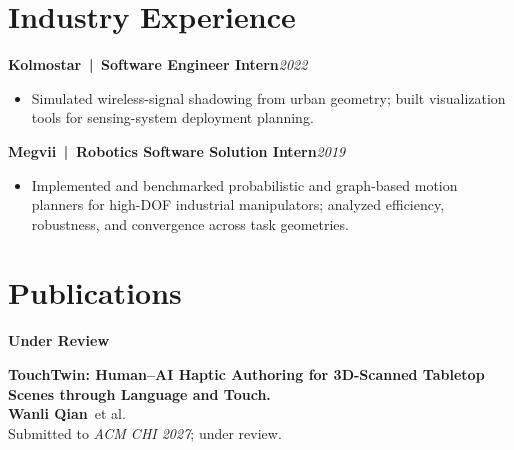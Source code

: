 \documentclass[10pt,letterpaper]{article}
\newcommand{\entry}[2]{\textbf{#1}\hfill\textit{#2}\\}
\newcommand{\pub}[3]{\begin{minipage}[t]{\linewidth}#1\\[-1pt]#2\\[-1pt]#3\end{minipage}\par\vspace{5pt}}
\newcommand{\me}{\textbf{Wanli Qian}}
\begin{document}
\section{Industry Experience}
\entry{Kolmostar \,|\, Software Engineer Intern}{2022}
\vspace{-11pt}
\begin{itemize}
  \item Simulated wireless-signal shadowing from urban geometry; built visualization tools for sensing-system deployment planning.
\end{itemize}
\entry{Megvii \,|\, Robotics Software Solution Intern}{2019}
\vspace{-11pt}
\begin{itemize}
  \item Implemented and benchmarked probabilistic and graph-based motion planners for high-DOF industrial manipulators;
        analyzed efficiency, robustness, and convergence across task geometries.
\end{itemize}

\section{Publications}
{\color{navy}\textbf{Under Review}}\par\vspace{3pt}
\pub{\textbf{TouchTwin: Human--AI Haptic Authoring for 3D-Scanned Tabletop Scenes through Language and Touch.}}
    {\me\ et al.}
    {Submitted to \textit{ACM CHI 2027}; under review.}
\end{document}
